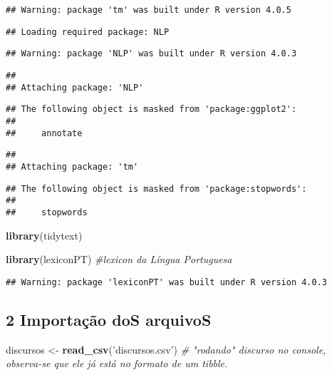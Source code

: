 \documentclass[
]{article}
\newenvironment{Shaded}{\begin{snugshade}}{\end{snugshade}}
\newcommand{\CommentTok}[1]{\textcolor[rgb]{0.56,0.35,0.01}{\textit{#1}}}
\newcommand{\KeywordTok}[1]{\textcolor[rgb]{0.13,0.29,0.53}{\textbf{#1}}}
\newcommand{\NormalTok}[1]{#1}
\newcommand{\StringTok}[1]{\textcolor[rgb]{0.31,0.60,0.02}{#1}}
\begin{document}
\begin{verbatim}
## Warning: package 'tm' was built under R version 4.0.5
\end{verbatim}

\begin{verbatim}
## Loading required package: NLP
\end{verbatim}

\begin{verbatim}
## Warning: package 'NLP' was built under R version 4.0.3
\end{verbatim}

\begin{verbatim}
## 
## Attaching package: 'NLP'
\end{verbatim}

\begin{verbatim}
## The following object is masked from 'package:ggplot2':
## 
##     annotate
\end{verbatim}

\begin{verbatim}
## 
## Attaching package: 'tm'
\end{verbatim}

\begin{verbatim}
## The following object is masked from 'package:stopwords':
## 
##     stopwords
\end{verbatim}

\begin{Shaded}
\begin{Highlighting}[]
\KeywordTok{library}\NormalTok{(tidytext)}

\KeywordTok{library}\NormalTok{(lexiconPT) }\CommentTok{#lexicon da Língua Portuguesa}
\end{Highlighting}
\end{Shaded}

\begin{verbatim}
## Warning: package 'lexiconPT' was built under R version 4.0.3
\end{verbatim}

\hypertarget{importauxe7uxe3o-dos-arquivos}{%
\subsection{2 Importação doS
arquivoS}\label{importauxe7uxe3o-dos-arquivos}}

\begin{Shaded}
\begin{Highlighting}[]
\NormalTok{discursos <-}\StringTok{ }\KeywordTok{read_csv}\NormalTok{(}\StringTok{'discursos.csv'}\NormalTok{) }\CommentTok{# "rodando" discurso no console, observa-se que ele já está no formato de um tibble.}
\end{Highlighting}
\end{Shaded}
\end{document}
